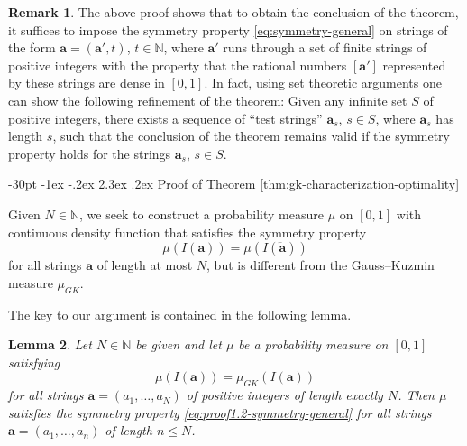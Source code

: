 \documentclass[10pt]{article}
\makeatletter
\renewcommand\section{\@startsection {section}{1}{\z@}
{-30pt \@plus -1ex \@minus -.2ex}
{2.3ex \@plus.2ex}
{\normalfont\normalsize\bfseries\boldmath}}
\newtheorem{lemma}{Lemma}
\theoremstyle{definition}
\newtheorem{remark}[lemma]{Remark}
\numberwithin{equation}{section}
\numberwithin{lemma}{section}
\newcommand{\NN}{\mathbb{N}}
\newcommand{\bfa}{\mathbf{a}}
\newcommand{\bfar}{\overleftarrow{\bfa}}
\makeatother
\begin{document}
\begin{remark}
\label{rem:thm1refinements}
The above proof shows that to obtain the conclusion of the
theorem, it suffices to impose the symmetry property
\eqref{eq:symmetry-general} on strings of the form
$\bfa=(\bfa',t)$, $t\in\NN$, 
where $\bfa'$ runs through a set of finite strings of positive integers
with the property that the rational numbers $[\bfa']$ represented by
these strings are dense in $[0,1]$.  
In fact, using set theoretic arguments one can show the following
refinement of the theorem: Given any infinite set $S$ of positive
integers, there exists a sequence of ``test strings'' $\bfa_s$, 
$s\in S$, where $\bfa_s$ has length
$s$, such that 
the conclusion of the theorem remains valid 
if the symmetry property holds for the strings $\bfa_s$, $s\in S$.
\end{remark}



\section{Proof of Theorem 
\protect \ref{thm:gk-characterization-optimality}}

\label{sec:thm2proof}


Given $N\in\NN$, we seek to construct a probability measure $\mu$ on
$[0,1]$ with continuous density function that satisfies the symmetry
property
\begin{equation}
\label{eq:proof1.2-symmetry-general}
\mu(I(\bfa))=\mu(I(\bfar))
\end{equation}
for all strings $\bfa$ of length at most
$N$, but is different from the Gauss--Kuzmin measure $\mu_{GK}$.

The key to our argument is contained in the following lemma.

\begin{lemma}
\label{lem:proof1.2-lem}
Let $N\in \NN$ be given and let $\mu$ be a probability measure
on $[0,1]$ satisfying 
\begin{equation}
\label{eq:proof1.2-lem1}
\mu(I(\bfa))=\mu_{GK}(I(\bfa))
\end{equation}
for all strings $\bfa=(a_1,\dots,a_N)$ of positive integers of length
exactly $N$. Then $\mu$ satisfies the symmetry property
\eqref{eq:proof1.2-symmetry-general} for all strings
$\bfa=(a_1,\dots,a_n)$ of length $n\le N$.
\end{lemma}
\end{document}
